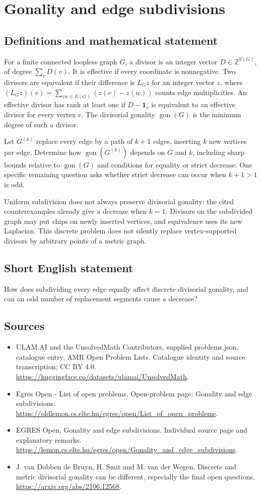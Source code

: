 \documentclass[11pt,a4paper]{article}
\begin{document}
\section*{Gonality and edge subdivisions}\label{statement}

\subsection{Definitions and mathematical statement}
For a finite connected loopless graph $G$, a divisor is an integer
vector $D\in\mathbb Z^{V(G)}$, of degree $\sum_vD(v)$. It is effective
if every coordinate is nonnegative. Two divisors are equivalent if
their difference is $L_Gz$ for an integer vector $z$, where
$(L_Gz)(v)=\sum_{vw\in E(G)}(z(v)-z(w))$ counts edge multiplicities.
An effective divisor has rank at least one if $D-\mathbf1_v$ is
equivalent to an effective divisor for every vertex $v$.
The divisorial gonality $\operatorname{gon}(G)$ is the minimum degree
of such a divisor.

Let $G^{(k)}$ replace every edge by a path of $k+1$ edges, inserting
$k$ new vertices per edge. Determine how $\operatorname{gon}(G^{(k)})$
depends on $G$ and $k$, including sharp bounds relative to
$\operatorname{gon}(G)$ and conditions for equality or strict decrease.
One specific remaining question asks whether strict decrease can
occur when $k+1>1$ is odd.

Uniform subdivision does not always preserve divisorial gonality:
the cited counterexamples already give a decrease when $k=1$.
Divisors on the subdivided graph may put chips on newly inserted
vertices, and equivalence uses its new Laplacian. This discrete problem
does not silently replace vertex-supported divisors by arbitrary
points of a metric graph.
\subsection{Short English statement}
How does subdividing every edge equally affect discrete divisorial
gonality, and can an odd number of replacement segments cause a decrease?
\subsection{Sources}
\begin{itemize}
\item[S1] ULAM.AI and the UnsolvedMath Contributors, supplied problems.json, catalogue entry, AMR Open Problem Lists. Catalogue identity and source transcription; CC BY 4.0.
\url{https://huggingface.co/datasets/ulamai/UnsolvedMath}.
\item[S2] Egres Open - List of open problems, Open-problem page: Gonality and edge subdivisions. 
\url{https://oldlemon.cs.elte.hu/egres/open/List_of_open_problems}.
\item[S3] EGRES Open, Gonality and edge subdivisions. Individual source page and explanatory remarks.
\url{https://lemon.cs.elte.hu/egres/open/Gonality_and_edge_subdivisions}.
\item[S4] J. van Dobben de Bruyn, H. Smit and M. van der Wegen, Discrete and metric divisorial gonality can be different, especially the final open questions.
\url{https://arxiv.org/abs/2106.12568}.
\end{itemize}
\end{document}
